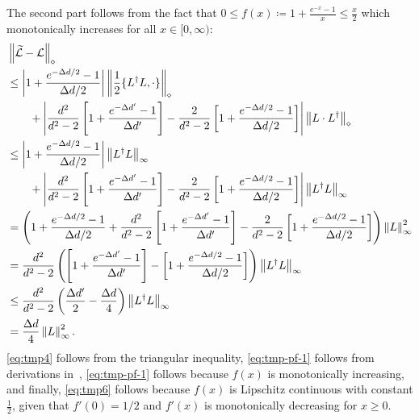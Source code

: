 \documentclass[superscriptaddress,amsmath,amssymb,aps,pra,letterpaper,tightenlines,notitlepages,12pt]{revtex4-2}
\begin{document}
The second part follows from the fact that $0\leq f(x)\coloneqq 1+\frac{e^{-x}-1}{x}\leq\tfrac{x}{2}$ which monotonically increases for all $ x\in[0, \infty)$:
\begin{align}
    & \left\Vert\widetilde{\mathcal{L}}-\mathcal{L}\right\Vert_\diamond \notag \\
    &\leq \left\vert1+\frac{e^{-\Delta d/2}-1}{\Delta d/2}\right\vert\left\Vert \frac{1}{2}\{L^\dagger L, \cdot \} \right\Vert_\diamond \notag \\ 
    &\qquad + \left\vert\frac{d^2}{d^2-2}\left[1+\frac{e^{-\Delta d'}-1}{\Delta d'}\right] - \frac{2}{d^2-2}\left[1+\frac{e^{-\Delta d/2}-1}{\Delta d/2}\right]\right\vert \left\Vert L\cdot L^\dagger\right\Vert_\diamond \label{eq:tmp4} \\
    &\leq \left\vert1+\frac{e^{-\Delta d/2}-1}{\Delta d/2}\right\vert\left\Vert L^\dagger L\right\Vert_\infty \notag \\ 
    &\qquad + \left\vert\frac{d^2}{d^2-2}\left[1+\frac{e^{-\Delta d'}-1}{\Delta d'}\right] - \frac{2}{d^2-2}\left[1+\frac{e^{-\Delta d/2}-1}{\Delta d/2}\right]\right\vert \left\Vert L^\dagger L\right\Vert_\infty \label{eq:tmp-pf-1} \\
    &= \left(1+\frac{e^{-\Delta d/2}-1}{\Delta d/2} + \frac{d^2}{d^2-2}\left[1+\frac{e^{-\Delta d'}-1}{\Delta d'}\right] - \frac{2}{d^2-2}\left[1+\frac{e^{-\Delta d/2}-1}{\Delta d/2}\right] \right)\left\Vert L\right\Vert_\infty^2 \label{eq:tmp-pf-2}\\
    &= \frac{d^2}{d^2-2}\left(\left[1+\frac{e^{-\Delta d'}-1}{\Delta d'}\right] - \left[1+\frac{e^{-\Delta d/2}-1}{\Delta d/2}\right]\right)\left\Vert L^\dagger L\right\Vert_\infty \label{eq:tmp5} \\
    &\leq\frac{d^2}{d^2-2}\left(\frac{\Delta d'}{2}-\frac{\Delta d}{4}\right) \left\Vert L^\dagger L\right\Vert_\infty \label{eq:tmp6} \\
    &=\frac{\Delta d}{4}\left\Vert L\right\Vert_\infty^2.
\end{align}
\eqref{eq:tmp4} follows from the triangular inequality, \eqref{eq:tmp-pf-1} follows from derivations in~\cite{go2025SamplebasedHamiltonianLindbladian}, \eqref{eq:tmp-pf-1} follows because $f(x)$ is monotonically increasing, and finally, \eqref{eq:tmp6} follows because $f(x)$ is Lipschitz continuous with constant $\frac{1}{2}$, given that $f'(0)=1/2$ and $f'(x)$ is monotonically decreasing for $x\geq 0$.
\end{document}

